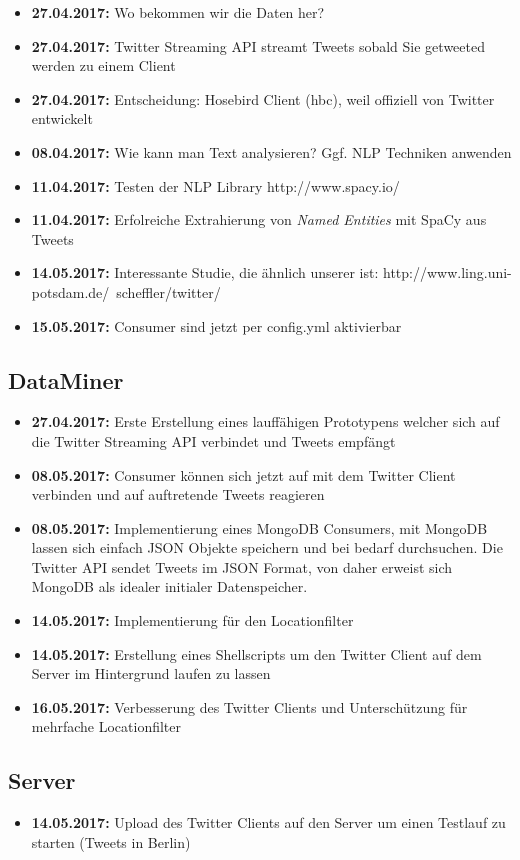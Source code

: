 \documentclass[12pt, 
	a4paper, 
	oneside, 
	leqno]{scrreprt}
\begin{document}
\begin{itemize}
  \item \textbf{27.04.2017:} Wo bekommen wir die Daten her?
  \item \textbf{27.04.2017:} Twitter Streaming API streamt Tweets sobald Sie getweeted werden zu einem Client
  \item \textbf{27.04.2017:} Entscheidung: Hosebird Client (hbc), weil offiziell von Twitter entwickelt
  \item \textbf{08.04.2017:} Wie kann man Text analysieren? Ggf. NLP Techniken anwenden
  \item \textbf{11.04.2017:} Testen der NLP Library http://www.spacy.io/
  \item \textbf{11.04.2017:} Erfolreiche Extrahierung von \textit{Named Entities} mit SpaCy aus Tweets
  \item \textbf{14.05.2017:} Interessante Studie, die ähnlich unserer ist: http://www.ling.uni-potsdam.de/~scheffler/twitter/
  \item \textbf{15.05.2017:} Consumer sind jetzt per config.yml aktivierbar  
\end{itemize}



\subsection*{DataMiner}

\begin{itemize}
  \item \textbf{27.04.2017:} Erste Erstellung eines lauffähigen Prototypens welcher sich auf die Twitter Streaming API verbindet und Tweets empfängt
  \item \textbf{08.05.2017:} Consumer können sich jetzt auf mit dem Twitter Client verbinden und auf auftretende Tweets reagieren
  \item \textbf{08.05.2017:} Implementierung eines MongoDB Consumers, mit MongoDB lassen sich einfach JSON Objekte speichern und bei bedarf durchsuchen. Die Twitter API sendet Tweets im JSON Format, von daher erweist sich MongoDB als idealer initialer Datenspeicher.
  \item \textbf{14.05.2017:} Implementierung für den Locationfilter
  \item \textbf{14.05.2017:} Erstellung eines Shellscripts um den Twitter Client auf dem Server im Hintergrund laufen zu lassen
  \item \textbf{16.05.2017:} Verbesserung des Twitter Clients und Unterschützung für mehrfache Locationfilter
\end{itemize}

\subsection*{Server}

\begin{itemize}
  \item \textbf{14.05.2017:} Upload des Twitter Clients auf den Server um einen Testlauf zu starten (Tweets in Berlin)
\end{itemize}
\end{document}
